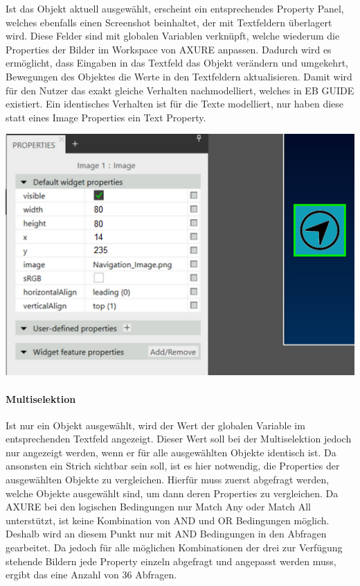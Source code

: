 Ist das Objekt aktuell ausgewählt, erscheint ein entsprechendes Property Panel, welches ebenfalls einen Screenshot beinhaltet, der mit Textfeldern überlagert wird.
Diese Felder sind mit globalen Variablen verknüpft, welche wiederum die Properties der Bilder im Workspace von AXURE anpassen.
Dadurch wird es ermöglicht, dass Eingaben in das Textfeld das Objekt verändern und umgekehrt, Bewegungen des Objektes die Werte in den Textfeldern aktualisieren.
Damit wird für den Nutzer das exakt gleiche Verhalten nachmodelliert, welches in EB GUIDE existiert.
Ein identisches Verhalten ist für die Texte modelliert, nur haben diese statt eines Image Properties ein Text Property.

\begin{center}
  \includegraphics[scale=0.8]{figures/Prototyp_04.PNG}
  \label{fig:Prototyp_04}
\end{center}

\paragraph{Multiselektion}
Ist nur ein Objekt ausgewählt, wird der Wert der globalen Variable im entsprechenden Textfeld angezeigt.
Dieser Wert soll bei der Multiselektion jedoch nur angezeigt werden, wenn er für alle ausgewählten Objekte identisch ist.
Da ansonsten ein Strich sichtbar sein soll, ist es hier notwendig, die Properties der ausgewählten Objekte zu vergleichen.
Hierfür muss zuerst abgefragt werden, welche Objekte ausgewählt sind, um dann deren Properties zu vergleichen.
Da AXURE bei den logischen Bedingungen nur \glqq Match Any\grqq{} oder \glqq Match All\grqq{} unterstützt, ist keine Kombination von AND und OR Bedingungen möglich.
Deshalb wird an diesem Punkt nur mit AND Bedingungen in den Abfragen gearbeitet.
Da jedoch für alle möglichen Kombinationen der drei zur Verfügung stehende Bildern jede Property einzeln abgefragt und angepasst werden muss, ergibt das eine Anzahl von 36 Abfragen.

